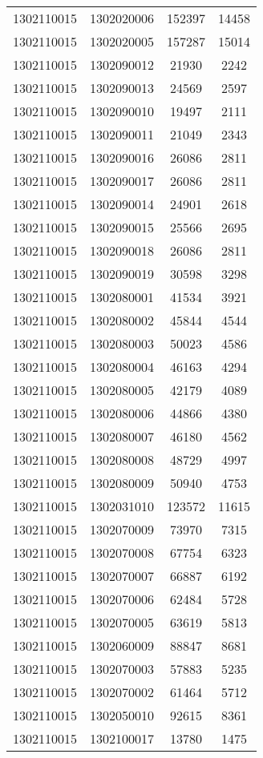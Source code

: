 \begin{longtable}[h]{llcc}
		1302110015 & 1302020006 & 152397 & 14458\\
		1302110015 & 1302020005 & 157287 & 15014\\
		1302110015 & 1302090012 & 21930 & 2242\\
		1302110015 & 1302090013 & 24569 & 2597\\
		1302110015 & 1302090010 & 19497 & 2111\\
		1302110015 & 1302090011 & 21049 & 2343\\
		1302110015 & 1302090016 & 26086 & 2811\\
		1302110015 & 1302090017 & 26086 & 2811\\
		1302110015 & 1302090014 & 24901 & 2618\\
		1302110015 & 1302090015 & 25566 & 2695\\
		1302110015 & 1302090018 & 26086 & 2811\\
		1302110015 & 1302090019 & 30598 & 3298\\
		1302110015 & 1302080001 & 41534 & 3921\\
		1302110015 & 1302080002 & 45844 & 4544\\
		1302110015 & 1302080003 & 50023 & 4586\\
		1302110015 & 1302080004 & 46163 & 4294\\
		1302110015 & 1302080005 & 42179 & 4089\\
		1302110015 & 1302080006 & 44866 & 4380\\
		1302110015 & 1302080007 & 46180 & 4562\\
		1302110015 & 1302080008 & 48729 & 4997\\
		1302110015 & 1302080009 & 50940 & 4753\\
		1302110015 & 1302031010 & 123572 & 11615\\
		1302110015 & 1302070009 & 73970 & 7315\\
		1302110015 & 1302070008 & 67754 & 6323\\
		1302110015 & 1302070007 & 66887 & 6192\\
		1302110015 & 1302070006 & 62484 & 5728\\
		1302110015 & 1302070005 & 63619 & 5813\\
		1302110015 & 1302060009 & 88847 & 8681\\
		1302110015 & 1302070003 & 57883 & 5235\\
		1302110015 & 1302070002 & 61464 & 5712\\
		1302110015 & 1302050010 & 92615 & 8361\\
		1302110015 & 1302100017 & 13780 & 1475\\

\end{longtable}
